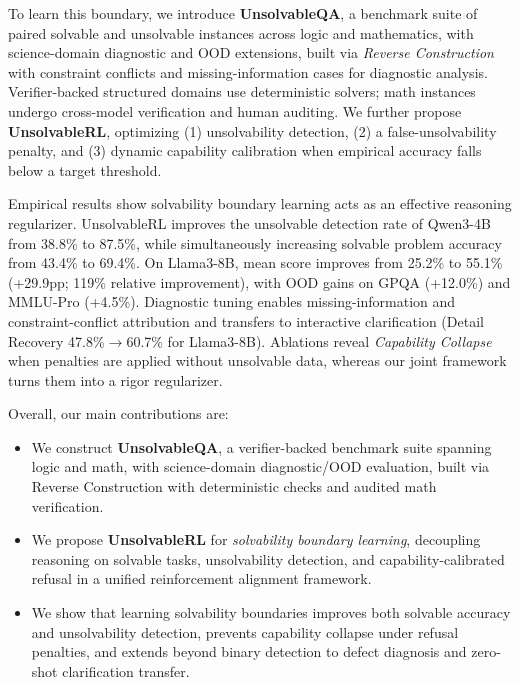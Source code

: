 To learn this boundary, we introduce \textbf{UnsolvableQA}, a benchmark suite of paired solvable and unsolvable instances across logic and mathematics, with science-domain diagnostic and OOD extensions, built via \textit{Reverse Construction} with constraint conflicts and missing-information cases for diagnostic analysis. Verifier-backed structured domains use deterministic solvers; math instances undergo cross-model verification and human auditing. We further propose \textbf{UnsolvableRL}, optimizing (1) unsolvability detection, (2) a false-unsolvability penalty, and (3) dynamic capability calibration when empirical accuracy falls below a target threshold.

Empirical results show solvability boundary learning acts as an effective reasoning regularizer. UnsolvableRL improves the unsolvable detection rate of Qwen3-4B from 38.8\% to 87.5\%, while simultaneously increasing solvable problem accuracy from 43.4\% to 69.4\%. On Llama3-8B, mean score improves from 25.2\% to 55.1\% (+29.9pp; 119\% relative improvement), with OOD gains on GPQA (+12.0\%) and MMLU-Pro (+4.5\%). Diagnostic tuning enables missing-information and constraint-conflict attribution and transfers to interactive clarification (Detail Recovery 47.8\%$\rightarrow$60.7\% for Llama3-8B). Ablations reveal \textit{Capability Collapse} when penalties are applied without unsolvable data, whereas our joint framework turns them into a rigor regularizer.

Overall, our main contributions are:
\begin{itemize}[leftmargin=16pt, itemsep=0pt, topsep=0pt]
    \item We construct \textbf{UnsolvableQA}, a verifier-backed benchmark suite spanning logic and math, with science-domain diagnostic/OOD evaluation, built via Reverse Construction with deterministic checks and audited math verification.
    \item We propose \textbf{UnsolvableRL} for \textit{solvability boundary learning}, decoupling reasoning on solvable tasks, unsolvability detection, and capability-calibrated refusal in a unified reinforcement alignment framework.
    \item We show that learning solvability boundaries improves both solvable accuracy and unsolvability detection, prevents capability collapse under refusal penalties, and extends beyond binary detection to defect diagnosis and zero-shot clarification transfer.
\end{itemize}
